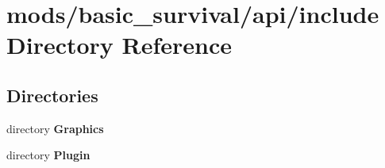 \section{mods/basic\+\_\+survival/api/include Directory Reference}
\label{dir_b694d619db6e2e82e6876086c71fffab}
\subsection*{Directories}
\begin{DoxyCompactItemize}
\item 
directory {\bf Graphics}
\item 
directory {\bf Plugin}
\end{DoxyCompactItemize}
